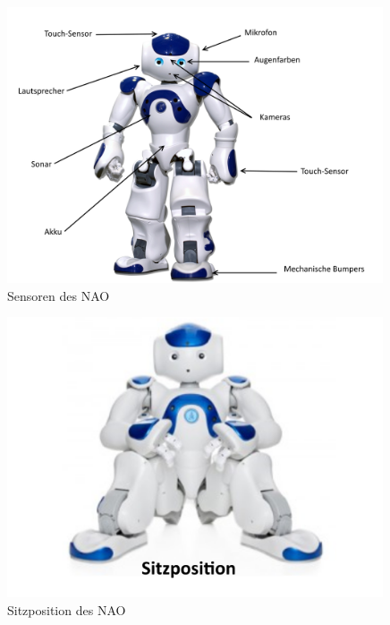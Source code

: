 \begin{appendix}
        \begin{figure}[ht]
            \centering
            \includegraphics[width=0.99\textwidth]{src/pictures/nao-sensors.png}
            \caption{Sensoren des NAO}
            \label{img:nao:sensors}
        \end{figure}

        \begin{figure}[ht]
            \centering
            \includegraphics[width=0.99\textwidth]{src/pictures/nao-sitting.png}
            \caption{Sitzposition des NAO}
            \label{img:nao:sitting}
        \end{figure}


\end{appendix}

